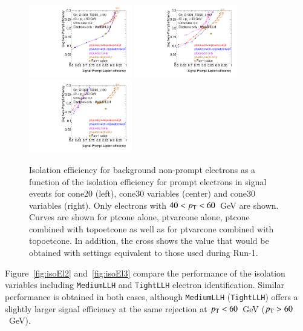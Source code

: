 \begin{figure}[phtb!]
\begin{center}
\includegraphics[width=0.4\textwidth]{FIGURES/ISOLATION/Gtt_G1300_T5000_L100_pt3-3_cone20_id11_med.pdf}
\includegraphics[width=0.4\textwidth]{FIGURES/ISOLATION/Gtt_G1300_T5000_L100_pt3-3_cone30_id11_med.pdf}\\
\includegraphics[width=0.4\textwidth]{FIGURES/ISOLATION/Gtt_G1300_T5000_L100_pt3-3_cone40_id11_med.pdf}
\end{center}
\vspace{-0.2cm}
\caption{Isolation efficiency for background non-prompt electrons as a function of the isolation efficiency for prompt electrons in signal events for cone20 (left), cone30 variables (center) and cone30 variables (right). Only electrons with $40<p_{\mathrm{T}}<60$~GeV are shown. Curves are shown for ptcone alone, ptvarcone alone, ptcone combined with topoetcone as well as for ptvarcone combined with topoetcone. In addition, the cross shows the value that would be obtained with settings equivalent to those used during Run-1.}
\label{fig:isoEl1}
\end{figure}

Figure~\ref{fig:isoEl2} and~\ref{fig:isoEl3} compare the performance of the isolation variables including {\tt MediumLLH} and {\tt TightLLH} electron identification. Similar performance is obtained in both cases, although {\tt MediumLLH} 
({\tt TightLLH}) offers a slightly larger signal efficiency at the same rejection at $p_{\mathrm{T}}<60$~GeV ($p_{\mathrm{T}}>60$~GeV). 

